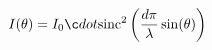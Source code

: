 \documentclass[preview]{standalone}
\begin{document}
\begin{align*}
I ( \theta ) =  I _0 \c d ot  \text{sinc} ^2\left(\frac{ d   \pi }{ \lambda }  \sin ( \theta )\right)
\end{align*}
\end{document}
